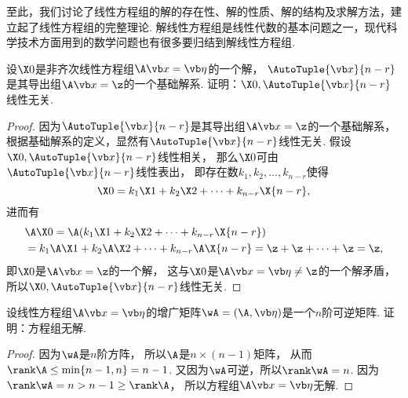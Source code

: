 至此，我们讨论了线性方程组的解的存在性、解的性质、解的结构及求解方法，建立起了线性方程组的完整理论.
解线性方程组是线性代数的基本问题之一，现代科学技术方面用到的数学问题也有很多要归结到解线性方程组.

\begin{example}
设\(\X0\)是非齐次线性方程组\(\A\x=\b\)的一个解，
\(\AutoTuple{\x}{n-r}\)是其导出组\(\A\x=\z\)的一个基础解系.
证明：\(\X0,\AutoTuple{\x}{n-r}\)线性无关.
\begin{proof}
因为\(\AutoTuple{\x}{n-r}\)是其导出组\(\A\x=\z\)的一个基础解系，
根据基础解系的定义，显然有\(\AutoTuple{\x}{n-r}\)线性无关.
假设\(\X0,\AutoTuple{\x}{n-r}\)线性相关，
那么\(\X0\)可由\(\AutoTuple{\x}{n-r}\)线性表出，
即存在数\(k_1,k_2,\dotsc,k_{n-r}\)使得\[
	\X0 = k_1 \X1 + k_2 \X2 + \dotsb + k_{n-r} \X{n-r},
\]
进而有\begin{align*}
	&\A\X0 = \A(k_1 \X1 + k_2 \X2 + \dotsb + k_{n-r} \X{n-r}) \\
	&= k_1 \A\X1 + k_2 \A\X2 + \dotsb + k_{n-r} \A\X{n-r}
	= \z + \z + \dotsb + \z = \z,
\end{align*}
即\(\X0\)是\(\A\x=\z\)的一个解，
这与\(\X0\)是\(\A\x=\b\neq\z\)的一个解矛盾，
所以\(\X0,\AutoTuple{\x}{n-r}\)线性无关.
\end{proof}
\end{example}

\begin{example}
设线性方程组\(\A\x=\b\)的增广矩阵\(\wA = (\A,\b)\)是一个\(n\)阶可逆矩阵.
证明：方程组无解.
\begin{proof}
因为\(\wA\)是\(n\)阶方阵，
所以\(\A\)是\(n \times (n-1)\)矩阵，
从而\(\rank\A \leq \min\{n-1,n\} = n-1\).
又因为\(\wA\)可逆，所以\(\rank\wA = n\).
因为\(\rank\wA = n > n-1 \geq \rank\A\)，
所以方程组\(\A\x=\b\)无解.
\end{proof}
\end{example}
